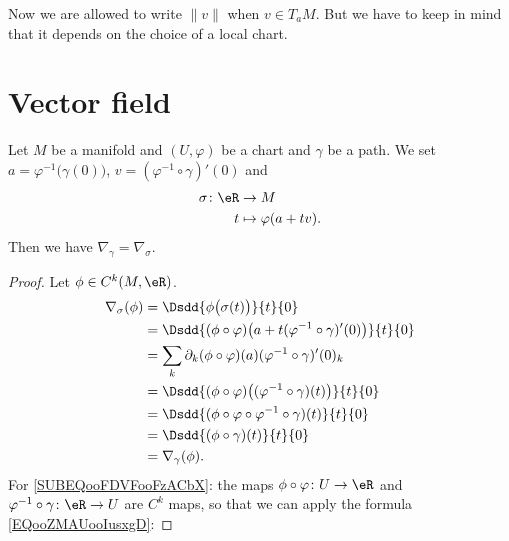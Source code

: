 Now we are allowed to write \( \| v \|\) when \( v\in T_aM\). But we have to keep in mind that it depends on the choice of a local chart.

\section{Vector field}

\begin{lemma}       \label{LEMooXFNQooXwCMNB}
	Let \( M\) be a manifold and \( (U,\varphi)\) be a chart and \( \gamma\) be a path. We set \( a=\varphi^{-1}\big( \gamma(0) \big)\), \(v= (\varphi^{-1}\circ\gamma)'(0)\) and
	\begin{equation}
		\begin{aligned}
			\sigma\colon \eR & \to M                  \\
			t                & \mapsto \varphi(a+tv).
		\end{aligned}
	\end{equation}
	Then we have \( \nabla_{\gamma}=\nabla_{\sigma}\).
\end{lemma}

\begin{proof}
	Let \( \phi\in C^k(M, \eR)\).
	\begin{subequations}
		\begin{align}
			\nabla_{\sigma}(\phi) & =\Dsdd{ \phi\big( \sigma(t) \big) }{t}{0}                                                          \\
			                      & =\Dsdd{ (\phi\circ \varphi)\big( a+t(\varphi^{-1}\circ\gamma)'(0) \big) }{t}{0}                    \\
			                      & =\sum_k\partial_k(\phi\circ\varphi)(a)(\varphi^{-1}\circ\gamma)'(0)_k  \label{SUBEQooFDVFooFzACbX} \\
			                      & =\Dsdd{ (\phi\circ\varphi)\big( (\varphi^{-1}\circ\gamma)(t) \big) }{t}{0}                         \\
			                      & =\Dsdd{ (\phi\circ\varphi\circ\varphi^{-1}\circ\gamma)(t) }{t}{0}                                  \\
			                      & =\Dsdd{ (\phi\circ\gamma)(t) }{t}{0}                                                               \\
			                      & =\nabla_{\gamma}(\phi).
		\end{align}
	\end{subequations}
	For \eqref{SUBEQooFDVFooFzACbX}: the maps \( \phi\circ\varphi\colon U\to \eR\) and \( \varphi^{-1}\circ\gamma\colon \eR\to U\) are \( C^k\) maps, so that we can apply the formula \eqref{EQooZMAUooIusxgD}:
\end{proof}

